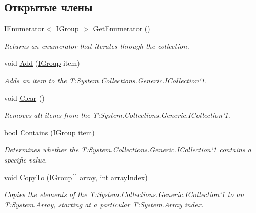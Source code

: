 \subsection*{Открытые члены}
\begin{DoxyCompactItemize}
\item 
I\+Enumerator$<$ \hyperlink{interface_security_1_1_interfaces_1_1_model_1_1_i_group}{I\+Group} $>$ \hyperlink{class_security_1_1_entity_framework_1_1_collections_1_1_group_collection_a8b1982f1a6f433d23dc8f41e40b9636d}{Get\+Enumerator} ()
\begin{DoxyCompactList}\small\item\em Returns an enumerator that iterates through the collection. \end{DoxyCompactList}\item 
void \hyperlink{class_security_1_1_entity_framework_1_1_collections_1_1_group_collection_ac7e4a9e6cbb17ae2bd0c30056dad2b6e}{Add} (\hyperlink{interface_security_1_1_interfaces_1_1_model_1_1_i_group}{I\+Group} item)
\begin{DoxyCompactList}\small\item\em Adds an item to the T\+:\+System.\+Collections.\+Generic.\+I\+Collection`1. \end{DoxyCompactList}\item 
void \hyperlink{class_security_1_1_entity_framework_1_1_collections_1_1_group_collection_a53a32fbd4d12e25cffce364f6ac87bf5}{Clear} ()
\begin{DoxyCompactList}\small\item\em Removes all items from the T\+:\+System.\+Collections.\+Generic.\+I\+Collection`1. \end{DoxyCompactList}\item 
bool \hyperlink{class_security_1_1_entity_framework_1_1_collections_1_1_group_collection_a13e181f27c4d6863d198026ecf4f047f}{Contains} (\hyperlink{interface_security_1_1_interfaces_1_1_model_1_1_i_group}{I\+Group} item)
\begin{DoxyCompactList}\small\item\em Determines whether the T\+:\+System.\+Collections.\+Generic.\+I\+Collection`1 contains a specific value. \end{DoxyCompactList}\item 
void \hyperlink{class_security_1_1_entity_framework_1_1_collections_1_1_group_collection_a1b2ecb7b735f0a92c3911e81a868ac8b}{Copy\+To} (\hyperlink{interface_security_1_1_interfaces_1_1_model_1_1_i_group}{I\+Group}\mbox{[}$\,$\mbox{]} array, int array\+Index)
\begin{DoxyCompactList}\small\item\em Copies the elements of the T\+:\+System.\+Collections.\+Generic.\+I\+Collection`1 to an T\+:\+System.\+Array, starting at a particular T\+:\+System.\+Array index. \end{DoxyCompactList}\item 

\end{DoxyCompactItemize}
